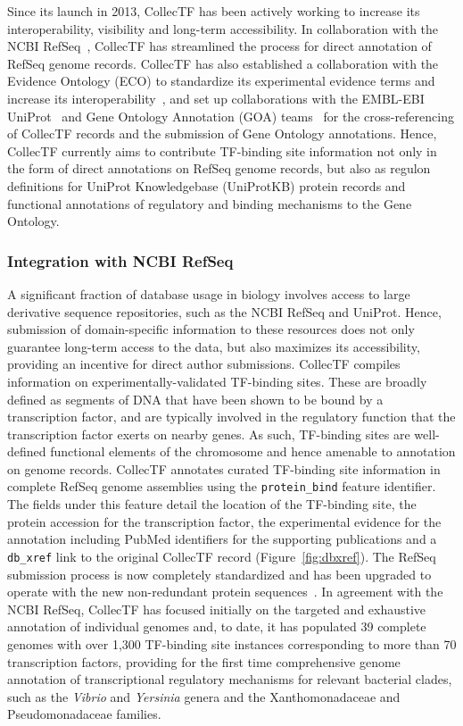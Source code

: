 Since its launch in 2013, CollecTF has been actively working to increase its
interoperability, visibility and long-term accessibility. In collaboration with
the NCBI RefSeq~\citep{pruitt2007ncbi}, CollecTF has streamlined the process for
direct annotation of RefSeq genome records. CollecTF has also established a
collaboration with the Evidence Ontology (ECO) to standardize its experimental
evidence terms and increase its
interoperability~\citep{chibucos2014standardized}, and set up collaborations
with the EMBL-EBI UniProt~\citep{uniprot2014uniprot} and Gene Ontology
Annotation (GOA) teams~\citep{ashburner2000gene} for the cross-referencing of
CollecTF records and the submission of Gene Ontology annotations. Hence,
CollecTF currently aims to contribute TF-binding site information not only in
the form of direct annotations on RefSeq genome records, but also as regulon
definitions for UniProt Knowledgebase (UniProtKB) protein records and
functional annotations of regulatory and binding mechanisms to the Gene
Ontology.


\subsubsection{Integration with NCBI RefSeq}

A significant fraction of database usage in biology involves access to large
derivative sequence repositories, such as the NCBI RefSeq and UniProt. Hence,
submission of domain-specific information to these resources does not only
guarantee long-term access to the data, but also maximizes its accessibility,
providing an incentive for direct author submissions. CollecTF compiles
information on experimentally-validated TF-binding sites. These are broadly
defined as segments of DNA that have been shown to be bound by a transcription
factor, and are typically involved in the regulatory function that the
transcription factor exerts on nearby genes. As such, TF-binding sites are
well-defined functional elements of the chromosome and hence amenable to
annotation on genome records. CollecTF annotates curated TF-binding site
information in complete RefSeq genome assemblies using the \verb|protein_bind|
feature identifier. The fields under this feature detail the location of the
TF-binding site, the protein accession for the transcription factor, the
experimental evidence for the annotation including PubMed identifiers for the
supporting publications and a \verb|db_xref| link to the original CollecTF
record (Figure~\ref{fig:dbxref}). The RefSeq submission process is now completely standardized
and has been upgraded to operate with the new non-redundant protein
sequences~\citep{o2015reference}. In agreement with the NCBI RefSeq, CollecTF
has focused initially on the targeted and exhaustive annotation of individual
genomes and, to date, it has populated 39 complete genomes with over 1,300
TF-binding site instances corresponding to more than 70 transcription factors,
providing for the first time comprehensive genome annotation of transcriptional
regulatory mechanisms for relevant bacterial clades, such as the
\textit{Vibrio} and \textit{Yersinia} genera and the Xanthomonadaceae and
Pseudomonadaceae families.

